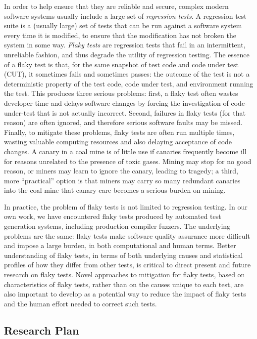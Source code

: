 \documentclass[10pt]{article}
\begin{document}
In order to help ensure that they are reliable and secure, complex modern software systems usually include a large set of \emph{regression tests}.  A regression test suite is a (usually large) set of tests that can be run against a software system every time it is modified, to ensure that the modification has not broken the system in some way.
\emph{Flaky tests} \cite{miccoflaky} are regression tests that fail in an intermittent, unreliable fashion, and thus degrade the utility of regression testing.  The essence of a flaky test is that, for the same snapshot of test code and code under test (CUT), it sometimes fails and sometimes passes:  the outcome of the test is not a deterministic property of the test code, code under test, and environment running the test.  This produces three serious problems:  first, a flaky test often wastes developer time and delays software changes by forcing the investigation of code-under-test that is not actually incorrect.  Second, failures in flaky tests (for that reason) are often ignored, and therefore serious software faults may be missed.  Finally, to mitigate these problems, flaky tests are often run multiple times, wasting valuable computing resources and also delaying acceptance of code changes.  A canary in a coal mine is of little use if canaries frequently become ill for reasons unrelated to the presence of toxic gases.  Mining may stop for no good reason, or miners may learn to ignore the canary, leading to tragedy; a third, more ``practical'' option is that miners may carry so many redundant canaries into the coal mine that canary-care becomes a serious burden on mining.

In practice, the problem of flaky tests is not limited to regression testing.  In our own work, we have encountered flaky tests produced by automated test generation systems, including production compiler fuzzers.  The underlying problems are the same:  flaky tests make software quality assurance more difficult and impose a large burden, in both computational and human terms.  Better understanding of flaky tests, in terms of both underlying causes and statistical profiles of how they differ from other tests, is critical to direct present and future research on flaky tests.  Novel approaches to mitigation for flaky tests, based on characteristics of flaky tests, rather than on the causes unique to each test, are also important to develop as a potential way to reduce the impact of flaky tests and the human effort needed to correct such tests.

\subsection{Research Plan}
\end{document}
